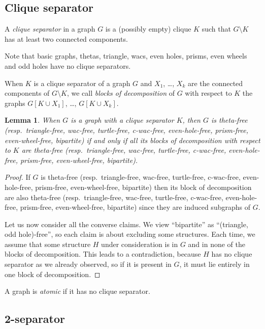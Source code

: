 \documentclass[11pt]{article}
\newtheorem{lemma}[theo]{Lemma}
\newcommand{\sm}{\setminus}
\begin{document}
\subsection*{Clique separator}

A \emph{clique separator} in a graph $G$ is a (possibly empty) clique $K$ such that $G\sm K$ has at least two connected components.  

Note that basic graphs, thetas, triangle, wacs, even holes, prisms, even wheels and odd holes have no clique separators. 

When $K$ is a clique separator of a graph $G$ and $X_1$, \dots, $X_k$ are the connected components of $G\sm K$, we call \emph{blocks of decomposition} of $G$ with respect to $K$ the graphs $G[K \cup X_1]$, \dots, $G[K \cup X_k]$.

\begin{lemma}
  \label{l:decClique}
  When $G$ is a graph with a clique separator $K$, then $G$ is
  theta-free (resp.\ triangle-free, wac-free, turtle-free, c-wac-free, even-hole-free, prism-free, even-wheel-free, bipartite) if and only if all its blocks of decomposition with respect to $K$ are theta-free (resp.\ triangle-free, wac-free, turtle-free, c-wac-free, even-hole-free, prism-free, even-wheel-free, bipartite).
\end{lemma}


\begin{proof}
  If $G$ is theta-free (resp.\ triangle-free, wac-free, turtle-free, c-wac-free, even-hole-free, prism-free, even-wheel-free, bipartite) then its block of decomposition are also theta-free (resp.\ triangle-free, wac-free, turtle-free, c-wac-free, even-hole-free, prism-free, even-wheel-free, bipartite) since they are induced subgraphs of $G$.

  Let us now consider all the converse claims. We view ``bipartite'' as ``(triangle, odd hole)-free'', so each claim is about excluding some structures. Each time, we assume that some structure $H$ under consideration is in $G$ and in none of the blocks of decomposition. This leads to a contradiction, because $H$ has no clique separator as we already observed, so if it is present in $G$, it must lie entirely in one block of decomposition. 
\end{proof}


A graph is \emph{atomic} if it has no clique separator.



\subsection*{2-separator}
\end{document}
